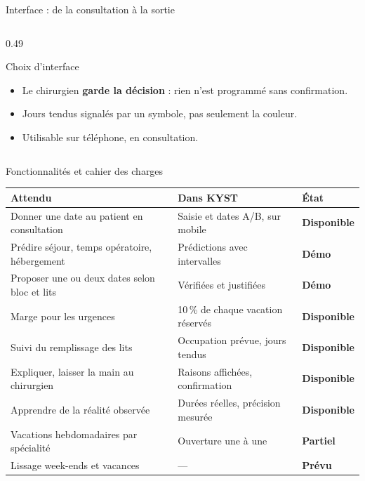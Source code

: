 \begin{frame}{Interface : de la consultation à la sortie}
\begin{columns}[T,onlytextwidth]
\begin{column}{0.49\textwidth}
\begin{exampleblock}{Choix d'interface}
        \footnotesize
        \begin{itemize}
          \item Le chirurgien \textbf{garde la décision} : rien n'est
            programmé sans confirmation.
          \item Jours tendus signalés par un symbole, pas seulement la
            couleur.
          \item Utilisable sur téléphone, en consultation.
        \end{itemize}
      \end{exampleblock}
    \end{column}
  \end{columns}
\end{frame}

\begin{frame}{Fonctionnalités et cahier des charges}
  \footnotesize
  \centering
  \renewcommand{\arraystretch}{1.18}
  \setlength{\tabcolsep}{7pt}
  \begin{tabular}{p{6.6cm}p{5.6cm}l}
    \toprule
    Attendu & Dans KYST & État \\
    \midrule
    Donner une date au patient en consultation & Saisie et dates A/B, sur
      mobile & {\color{McmSage}\textbf{Disponible}} \\
    Prédire séjour, temps opératoire, hébergement & Prédictions avec
      intervalles & {\color{McmAmber}\textbf{Démo}} \\
    Proposer une ou deux dates selon bloc et lits & Vérifiées et justifiées
      & {\color{McmAmber}\textbf{Démo}} \\
    Marge pour les urgences & 10\,\% de chaque vacation réservés &
      {\color{McmSage}\textbf{Disponible}} \\
    Suivi du remplissage des lits & Occupation prévue, jours tendus &
      {\color{McmSage}\textbf{Disponible}} \\
    Expliquer, laisser la main au chirurgien & Raisons affichées,
      confirmation & {\color{McmSage}\textbf{Disponible}} \\
    Apprendre de la réalité observée & Durées réelles, précision mesurée &
      {\color{McmSage}\textbf{Disponible}} \\
    Vacations hebdomadaires par spécialité & Ouverture une à une &
      {\color{McmTerracotta}\textbf{Partiel}} \\
    Lissage week-ends et vacances & --- & {\color{McmMuted}\textbf{Prévu}} \\
    \bottomrule
  \end{tabular}
\end{frame}

